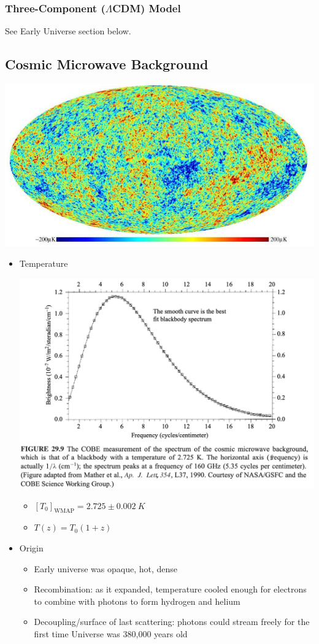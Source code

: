 \documentclass{book}
\begin{document}
\subsubsection{Three-Component ($\Lambda$CDM) Model}
See Early Universe section below.
\subsection{Cosmic Microwave Background}
\begin{center}
    \includegraphics[height = 0.4 \textwidth]{images/CMB.png}
\end{center}
\begin{itemize}
    \item Temperature
          \begin{center}
              \includegraphics[width = \textwidth]{images/cobe_spec.png}
          \end{center}
          \begin{itemize}
              \item $[T_0]_{\text{WMAP}} = 2.725 \pm 0.002\ K$
              \item $T(z) = T_0 (1 + z)$
          \end{itemize}
    \item Origin
          \begin{itemize}
              \item Early universe was opaque, hot, dense
              \item Recombination: as it expanded, temperature cooled enough for electrons to combine with photons to form hydrogen and helium
              \item Decoupling/surface of last scattering: photons could stream freely for the first time
                    Universe was 380,000 years old
          \end{itemize}
\end{itemize}
\end{document}
